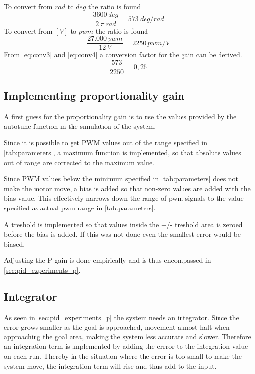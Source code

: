 To convert from $rad$ to $deg$ the ratio is found
\begin{equation}
\frac{3600 \ deg}{2 \ \pi \ rad} = 573 \ deg/rad
\label{eq:conv3}
\end{equation}
To convert from $[V]$ to $pwm$ the ratio is found
\begin{equation}
\frac{27.000 \ pwm}{12 \ V} = 2250 \ pwm/V
\label{eq:conv4}
\end{equation}
From \ref{eq:conv3} and \ref{eq:conv4} a conversion factor for the gain can be derived.
\begin{equation}
\frac{573}{2250} = 0,25
\label{eq:conv}
\end{equation}

\subsection{Implementing proportionality gain}
A first guess for the proportionality gain is to use the values provided by the autotune function in the simulation of the system. 

Since it is possible to get PWM values out of the range specified in \ref{tab:parameters}, a maximum function is implemented, so that absolute values out of range are corrected to the maximum value.

Since PWM values below the minimum specified in \ref{tab:parameters} does not make the motor move, a bias is added so that non-zero values are added with the bias value. This effectively narrows down the range of pwm signals to the value specified as actual pwm range in \ref{tab:parameters}. 

A treshold is implemented so that values inside the +/- treshold area is zeroed before the bias is added. If this was not done even the smallest error would be biased.

Adjusting the P-gain is done empirically and is thus encompassed in \ref{sec:pid_experiments_p}.

\subsection{Integrator}\label{sec:integrator}
As seen in \ref{sec:pid_experiments_p} the system needs an integrator. Since the error grows smaller as the goal is approached, movement almost halt when approaching the goal area, making the system less accurate and slower. Therefore an integration term is implemented by adding the errror to the integration value on each run. Thereby in the situation where the error is too small to make the system move, the integration term will rise and thus add to the input. 

